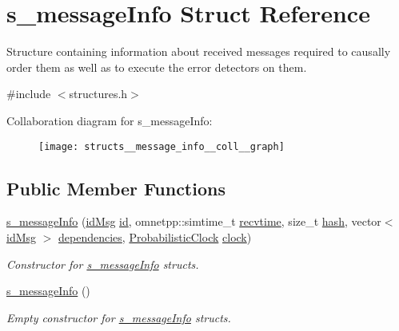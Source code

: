 \hypertarget{structs__message_info}{}\section{s\+\_\+message\+Info Struct Reference}
\label{structs__message_info}


Structure containing information about received messages required to causally order them as well as to execute the error detectors on them.  




{\ttfamily \#include $<$structures.\+h$>$}



Collaboration diagram for s\+\_\+message\+Info\+:
\nopagebreak
\begin{figure}[H]
\begin{center}
\leavevmode
\texttt{[image: structs\_\_message\_info\_\_coll\_\_graph]}
\end{center}
\end{figure}
\subsection*{Public Member Functions}
\begin{DoxyCompactItemize}
\item 
\hyperlink{structs__message_info_aa626a79c3b41f14b406f8d86b87fcfb9}{s\+\_\+message\+Info} (\hyperlink{structures_8h_a83a1d9a070efa5341da84cfd8e28d3e5}{id\+Msg} \hyperlink{structs__message_info_a6c2928774199848fd25b4e8ffb7870c2}{id}, omnetpp\+::simtime\+\_\+t \hyperlink{structs__message_info_a3600b24205dc07ce06774af44976c107}{recvtime}, size\+\_\+t \hyperlink{structs__message_info_a9b627c36e814fbbd04a89bc6e827e4ff}{hash}, vector$<$ \hyperlink{structures_8h_a83a1d9a070efa5341da84cfd8e28d3e5}{id\+Msg} $>$ \hyperlink{structs__message_info_a82f52cb53fb0e9b1b985f173f3a013be}{dependencies}, \hyperlink{class_probabilistic_clock}{Probabilistic\+Clock} \hyperlink{structs__message_info_ad35ea02bbca3d54d5b150bb6ea476888}{clock})
\begin{DoxyCompactList}\small\item\em Constructor for \hyperlink{structs__message_info}{s\+\_\+message\+Info} structs. \end{DoxyCompactList}\item 
\hyperlink{structs__message_info_a4cde6289906418221236646ae3df77c8}{s\+\_\+message\+Info} ()
\begin{DoxyCompactList}\small\item\em Empty constructor for \hyperlink{structs__message_info}{s\+\_\+message\+Info} structs. \end{DoxyCompactList}\end{DoxyCompactItemize}
